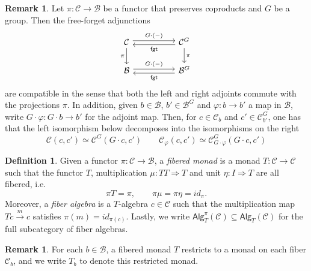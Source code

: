 \documentclass[a4paper,10pt
,draft
]{article}%
\numberwithin{equation}{section}
\numberwithin{figure}{section}
\theoremstyle{definition} %
\newtheorem{definition}[equation]{Definition}%
\newtheorem{remark}[equation]{Remark}%
\newcommand{\C}{\ensuremath{\mathcal C}}
\newcommand{\1}{\ensuremath{\mathbbm 1}}%
\begin{document}
\begin{remark}
Let $\pi \colon \mathcal{C} \to \mathcal{B}$
be a functor that preserves coproducts and $G$ be a group.
Then the free-forget adjunctions 
\begin{equation}
\begin{tikzcd}[column sep =50pt]
	\mathcal{C}
	\arrow[shift left]{r}{G \cdot (-)}
	\arrow[d, "\pi"']
&
	\mathcal{C}^G 
	\arrow[shift left]{l}{\mathsf{fgt}}
	\arrow[d, "\pi"]
\\
	\mathcal{B} 
	\arrow[shift left]{r}{G \cdot (-)}
&
	\mathcal{B}^G
	\arrow[shift left]{l}{\mathsf{fgt}}
\end{tikzcd}
\end{equation}
are compatible in the sense that both the left and right adjoints commute with the projections $\pi$.
In addition, given $b \in \mathcal{B}$, $b' \in \mathcal{B}^G$
and $\varphi \colon b \to b'$ a map in $\mathcal{B}$, write
$G\cdot \varphi \colon G\cdot b \to b'$
for the adjoint map.
Then, for $c \in \mathcal{C}_b$ and $c' \in \mathcal{C}^G_{b'}$,
one has that the left isomorphism below decomposes
into the isomorphisms on the right
\begin{equation}\label{ADJOVADJ EQ}
\C(c,c') 
\simeq 
\C^G(G \cdot c,c')\qquad
\C_{\varphi}(c,c') 
\simeq 
\C^G_{G\cdot\varphi}(G \cdot c,c')
\end{equation}
\end{remark}




\begin{definition}\label{FIBMON DEF}
Given a functor $\pi \colon \mathcal{C} \to \mathcal{B}$,
a \textit{fibered monad} is a monad $T \colon \mathcal{C} \to \mathcal{C}$ such that 
the functor $T$,
multiplication 
$\mu \colon TT \Rightarrow T$
and unit $\eta \colon I \Rightarrow T$
are all fibered, i.e.
\[
\pi T = \pi,\qquad
\pi\mu=\pi\eta=id_{\pi}.
\]
%
Moreover, a \textit{fiber algebra} is a $T$-algebra $c \in \mathcal{C}$
such that the multiplication map
$Tc \xrightarrow{m} c$ satisfies 
$\pi(m)=id_{\pi(c)}$.
%
Lastly, we write $\mathsf{Alg}^{\pi}_T(\mathcal{C}) \subseteq \mathsf{Alg}_T(\mathcal{C})$ for the full subcategory of fiber algebras.
\end{definition}


\begin{remark}
For each $b\in \mathcal{B}$, a fibered monad $T$ restricts to a monad on each fiber $\mathcal{C}_b$, and we write $T_b$ to denote this restricted monad.
\end{remark}
\end{document}
